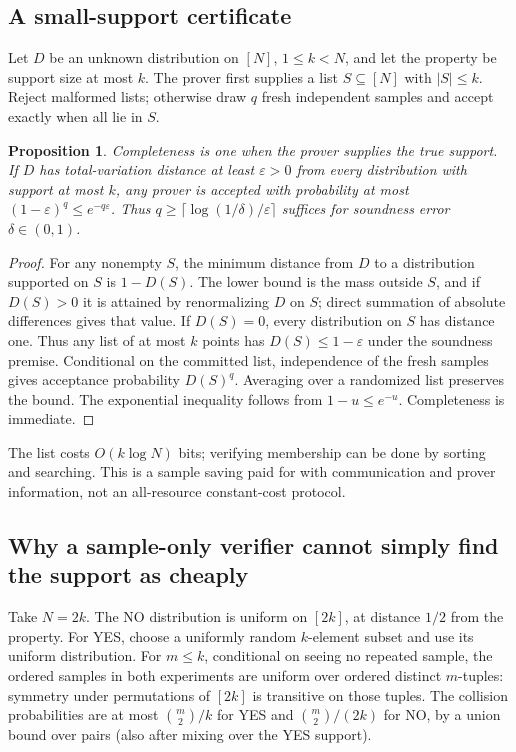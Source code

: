\documentclass[11pt]{article}
\newtheorem{proposition}{Proposition}
\begin{document}
\subsection{A small-support certificate}
Let $D$ be an unknown distribution on $[N]$, $1\le k<N$, and let the property be support size at most $k$. The prover first supplies a list $S\subseteq[N]$ with $|S|\le k$. Reject malformed lists; otherwise draw $q$ fresh independent samples and accept exactly when all lie in $S$.
\begin{proposition}
Completeness is one when the prover supplies the true support. If $D$ has total-variation distance at least $\varepsilon>0$ from every distribution with support at most $k$, any prover is accepted with probability at most $(1-\varepsilon)^q\le e^{-q\varepsilon}$. Thus $q\ge\lceil\log(1/\delta)/\varepsilon\rceil$ suffices for soundness error $\delta\in(0,1)$.
\end{proposition}
\begin{proof}
For any nonempty $S$, the minimum distance from $D$ to a distribution supported on $S$ is $1-D(S)$. The lower bound is the mass outside $S$, and if $D(S)>0$ it is attained by renormalizing $D$ on $S$; direct summation of absolute differences gives that value. If $D(S)=0$, every distribution on $S$ has distance one. Thus any list of at most $k$ points has $D(S)\le1-\varepsilon$ under the soundness premise. Conditional on the committed list, independence of the fresh samples gives acceptance probability $D(S)^q$. Averaging over a randomized list preserves the bound. The exponential inequality follows from $1-u\le e^{-u}$. Completeness is immediate.
\end{proof}
The list costs $O(k\log N)$ bits; verifying membership can be done by sorting and searching. This is a sample saving paid for with communication and prover information, not an all-resource constant-cost protocol.
\subsection{Why a sample-only verifier cannot simply find the support as cheaply}
Take $N=2k$. The NO distribution is uniform on $[2k]$, at distance $1/2$ from the property. For YES, choose a uniformly random $k$-element subset and use its uniform distribution. For $m\le k$, conditional on seeing no repeated sample, the ordered samples in both experiments are uniform over ordered distinct $m$-tuples: symmetry under permutations of $[2k]$ is transitive on those tuples. The collision probabilities are at most $\binom m2/k$ for YES and $\binom m2/(2k)$ for NO, by a union bound over pairs (also after mixing over the YES support).
\end{document}
